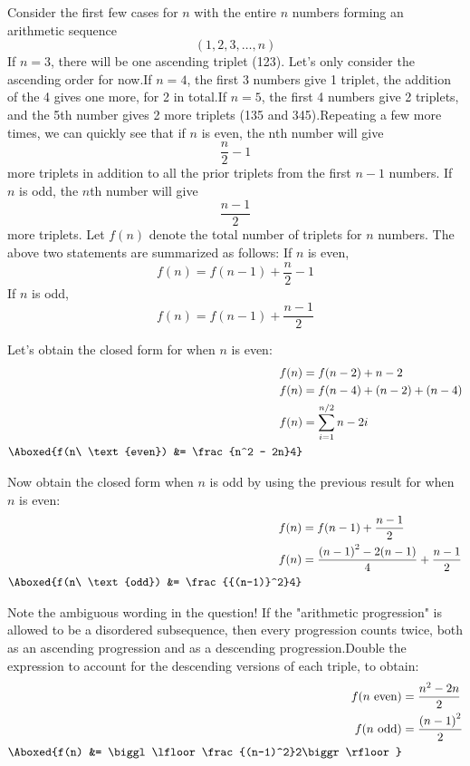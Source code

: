\begin{enumerate}
Consider the first few cases for $n$ with the entire $n$ numbers forming an arithmetic sequence 
 \[(1, 2, 3, \ldots, n)\]If $n = 3$, there will be one ascending triplet (123). Let's only consider the ascending order for now.If $n = 4$, the first 3 numbers give 1 triplet, the addition of the 4 gives one more, for 2 in total.If $n = 5$, the first 4 numbers give 2 triplets, and the 5th number gives 2 more triplets (135 and 345).Repeating a few more times, we can quickly see that if $n$ is even, the nth number will give 
 \[\frac{n}{2} - 1\] more triplets in addition to all the prior triplets from the first $n-1$ numbers. If $n$ is odd, the $n$th number will give 
 \[\frac{n-1}{2}\] more triplets. Let $f(n)$ denote the total number of triplets for $n$ numbers. The above two statements are summarized as follows: If $n$ is even, 
 \[f(n) = f(n-1) + \frac{n}2 - 1\]If $n$ is odd, 
 \[f(n) = f(n-1) + \frac{n-1}2\] 

 Let's obtain the closed form for when $n$ is even:
 \begin{align*} f(n) &= f(n-2) + n-2\\ f(n) &= f(n-4) + (n-2) + (n-4)\\ f(n) &= \sum_{i=1}^{n/2} n - 2i\\ \Aboxed{f(n\ \text{even}) &= \frac{n^2 - 2n}4} \end{align*}


 Now obtain the closed form when $n$ is odd by using the previous result for when $n$ is even:
 \begin{align*} f(n) &= f(n-1) + \frac{n-1}2\\ f(n) &= \frac{{(n-1)}^2 - 2(n-1)}4 + \frac{n-1}2\\ \Aboxed{f(n\ \text{odd}) &= \frac{{(n-1)}^2}4} \end{align*}


 Note the ambiguous wording in the question! If the "arithmetic progression" is allowed to be a disordered subsequence, then every progression counts twice, both as an ascending progression and as a descending progression.Double the expression to account for the descending versions of each triple, to obtain:
 \begin{align*} f(n\ \text{even}) &= \frac{n^2 - 2n}2\\ f(n\ \text{odd}) &= \frac{{(n-1)}^2}2\\ \Aboxed{f(n) &= \biggl\lfloor\frac{(n-1)^2}2\biggr\rfloor} \end{align*}






\end{enumerate}
